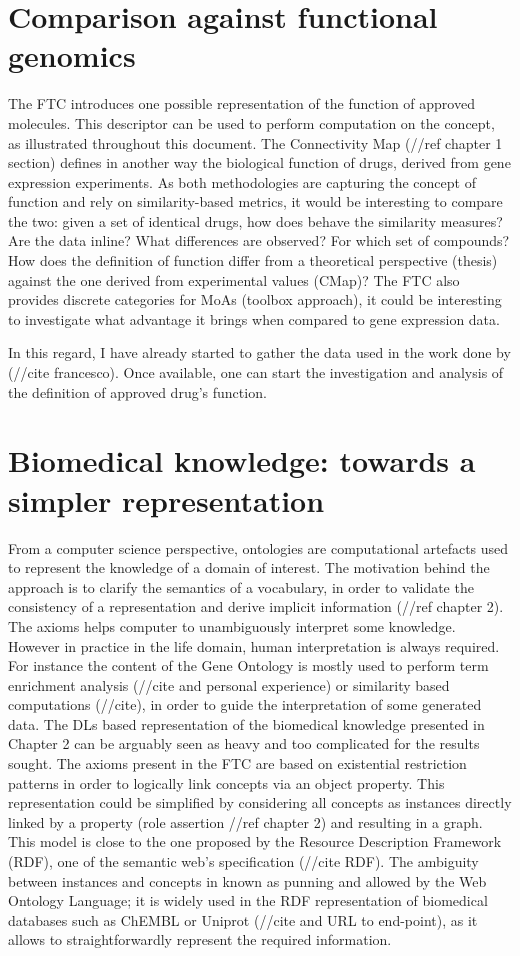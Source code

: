 \section{Comparison against functional genomics}
The FTC introduces one possible representation of the function of approved molecules. This descriptor can be used to perform computation on the concept, as illustrated throughout this document. The Connectivity Map (//ref chapter 1 section) defines in another way the biological function of drugs, derived from gene expression experiments. As both methodologies are capturing the concept of function and rely on similarity-based metrics, it would be interesting to compare the two: given a set of identical drugs, how does behave the similarity measures? Are the data inline? What differences are observed? For which set of compounds? How does the definition of function differ from a theoretical perspective (thesis) against the one derived from experimental values (CMap)? The FTC also provides discrete categories for MoAs (toolbox approach), it could be interesting to investigate what advantage it brings when compared to gene expression data.

In this regard, I have already started to gather the data used in the work done by (//cite francesco). Once available, one can start the investigation and analysis of the definition of approved drug’s function.

\section{Biomedical knowledge: towards a simpler representation}
From a computer science perspective, ontologies are computational artefacts used to represent the knowledge of a domain of interest. The motivation behind the approach is to clarify the semantics of a vocabulary, in order to validate the consistency of a representation and derive implicit information (//ref chapter 2). The axioms helps computer to unambiguously interpret some knowledge. However in practice in the life domain, human interpretation is always required. For instance the content of the Gene Ontology is mostly used to perform term enrichment analysis (//cite and personal experience) or similarity based computations (//cite), in order to guide the interpretation of some generated data. The DLs based representation of the biomedical knowledge presented in Chapter 2 can be arguably seen as heavy and too complicated for the results sought. The axioms present in the FTC are based on existential restriction patterns in order to logically link concepts via an object property. This representation could be simplified by considering all concepts as instances directly linked by a property (role assertion //ref chapter 2) and resulting in a graph. This model is close to the one proposed by the Resource Description Framework (RDF), one of the semantic web’s specification (//cite RDF). The ambiguity between instances and concepts in known as punning and allowed by the Web Ontology Language; it is widely used in the RDF representation of biomedical databases such as ChEMBL or Uniprot (//cite and URL to end-point), as it allows to straightforwardly represent the required information.

